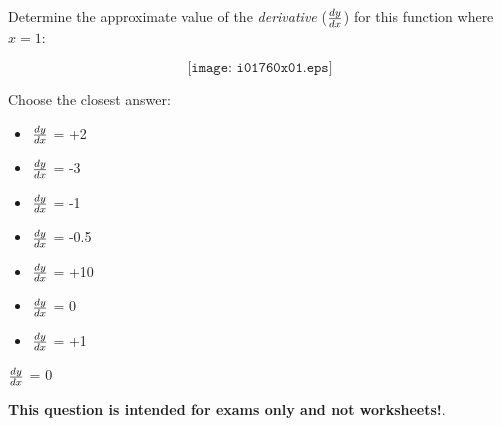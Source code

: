 

Determine the approximate value of the {\it derivative} ($dy \over dx$) for this function where $x=1$:

$$\texttt{[image: i01760x01.eps]}$$

Choose the closest answer:

\begin{itemize}
\item{} $dy \over dx$ = +2
\vskip 10pt 
\item{} $dy \over dx$ = -3
\vskip 10pt 
\item{} $dy \over dx$ = -1
\vskip 10pt 
\item{} $dy \over dx$ = -0.5
\vskip 10pt 
\item{} $dy \over dx$ = +10 
\vskip 10pt 
\item{} $dy \over dx$ = 0
\vskip 10pt 
\item{} $dy \over dx$ = +1

\end{itemize}







$dy \over dx$ = 0







{\bf This question is intended for exams only and not worksheets!}.



